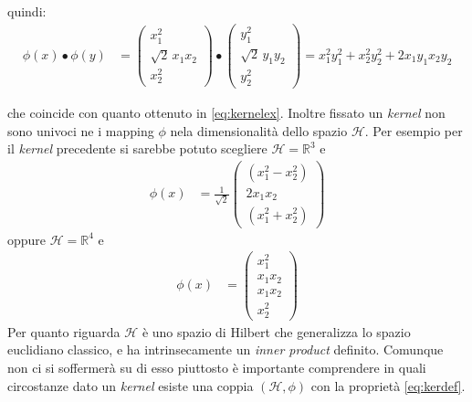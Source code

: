   quindi:
 \begin{align*}
    \phi(x) \bullet \phi(y) &= \begin{pmatrix}
           x_{1}^2 \\
           \sqrt{2}\,x_{1}x_{2} \\
           x_{2}^2
         \end{pmatrix}\bullet
         \begin{pmatrix}
           y_{1}^2 \\
           \sqrt{2}\,y_{1}y_{2} \\
           y_{2}^2
         \end{pmatrix} = x_{1}^{2}y_{1}^{2} + x_{2}^{2}y_{2}^{2} + 2x_{1}y_{1}x_{2}y_{2}
  \end{align*}

che coincide con quanto ottenuto in \eqref{eq:kernelex}. Inoltre fissato un \textit{kernel} non sono univoci ne i mapping $\phi$ nela dimensionalità dello spazio $\mathcal{H}$. Per esempio per il \textit{kernel} precedente si sarebbe potuto scegliere $\mathcal{H} = \mathbb{R}^3$ e 
 \begin{align*}
    \phi(x) &= \frac{1}{\sqrt{2}}\begin{pmatrix}
           (x_{1}^2 - x_{2}^2)\\
           2x_{1}x_{2} \\
           (x_{1}^2 + x_{2}^2)
         \end{pmatrix}
  \end{align*}
  oppure $\mathcal{H} = \mathbb{R}^4$ e
  \begin{align*}
    \phi(x) &= \begin{pmatrix}
           x_{1}^2\\
           x_{1}x_{2} \\
           x_{1}x_{2} \\
           x_{2}^2
         \end{pmatrix}
  \end{align*}
Per quanto riguarda $\mathcal{H}$ è uno spazio di Hilbert che generalizza lo spazio euclidiano classico, e ha intrinsecamente un \textit{inner product} definito. Comunque non ci si soffermerà su di esso piuttosto è importante comprendere in quali circostanze dato un \textit{kernel} esiste una coppia $(\mathcal{H} , \phi)$ con la proprietà \eqref{eq:kerdef}.

